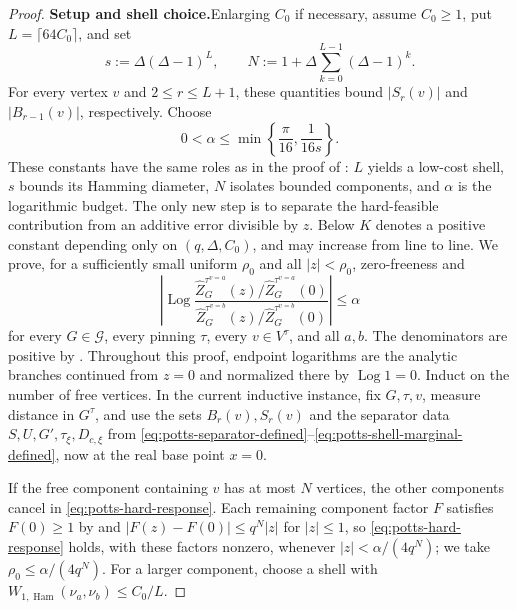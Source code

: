 \documentclass[11pt,reqno]{article}
\theoremstyle{plain}
\theoremstyle{definition}
\theoremstyle{remark}
\theoremstyle{definition}
\theoremstyle{remark}
\newcommand{\Log}{\operatorname{Log}}          %
\DeclareMathOperator{\Ham}{Ham}
\newcommand{\Deg}{\Delta}                        %
\newcommand{\WHam}{W_{1,\Ham}}                   %
\newcommand{\nZpin}[2]{\widehat Z_{#1}^{#2}}
\begin{document}
\begin{proof}
\textbf{Setup and shell choice.}\hspace{1em}Enlarging \(C_0\) if necessary, assume \(C_0\ge1\), put
\(L=\lceil64C_0\rceil\), and set
\[
  s:=\Deg(\Deg-1)^L,
  \qquad
  N:=1+\Deg\sum_{k=0}^{L-1}(\Deg-1)^k.
\]
For every vertex \(v\) and \(2\le r\le L+1\), these quantities bound
\(|S_r(v)|\) and \(|B_{r-1}(v)|\), respectively.  Choose
\[
  0<\alpha\le\min\left\{\frac\pi{16},\frac1{16s}\right\}.
\]
These constants have the same roles as in the proof of
: \(L\) yields a low-cost
shell, \(s\) bounds its Hamming diameter, \(N\) isolates bounded
components, and \(\alpha\) is the logarithmic budget.  The only new step is
to separate the hard-feasible contribution from an additive error divisible
by \(z\).
Below \(K\) denotes a positive constant depending only on
\((q,\Deg,C_0)\), and may increase from line to line.  We prove, for a
sufficiently small uniform \(\rho_0\) and all \(|z|<\rho_0\),
zero-freeness and
\begin{equation}\label{eq:potts-hard-response}
  \left|\Log
  \frac{\nZpin{G}{\tau^{v=a}}(z)/\nZpin{G}{\tau^{v=a}}(0)}
       {\nZpin{G}{\tau^{v=b}}(z)/\nZpin{G}{\tau^{v=b}}(0)}\right|
  \le\alpha
\end{equation}
for every \(G\in\mathcal G\), every pinning \(\tau\), every
\(v\in V^\tau\), and all \(a,b\).  The denominators are positive by
.  Throughout this proof, endpoint logarithms are the
analytic branches continued from \(z=0\) and normalized there by
\(\Log 1=0\).  Induct on the number of free vertices.  In the current
inductive instance, fix \(G,\tau,v\), measure distance in \(G^\tau\), and
use the sets \(B_r(v),S_r(v)\) and the separator data
\(S,U,G',\tau_\xi,D_{c,\xi}\) from
\eqref{eq:potts-separator-defined}--\eqref{eq:potts-shell-marginal-defined},
now at the real base point \(x=0\).

If the free component containing \(v\) has at most \(N\) vertices, the
other components cancel in \eqref{eq:potts-hard-response}.  Each
remaining component factor \(F\) satisfies \(F(0)\ge1\) by
 and \(|F(z)-F(0)|\le q^N|z|\) for \(|z|\le1\), so
\eqref{eq:potts-hard-response} holds, with these factors nonzero,
whenever \(|z|<\alpha/(4q^N)\); we take \(\rho_0\le\alpha/(4q^N)\).
For a larger component, choose a shell with
\(\WHam(\nu_a,\nu_b)\le C_0/L\).


\end{proof}
\end{document}
